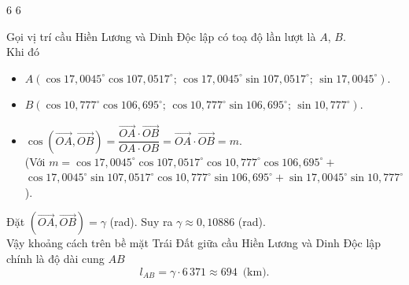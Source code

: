 \documentclass[12pt,a4paper,openany,twoside]{book}
\begin{document}
\begin{bt}
{\begin{center}
\begin{tikzpicture}[line join=round,line cap=round,font=\footnotesize,scale=1,>=stealth]
				\end{tikzpicture}6
			 6
		\end{center}
		Gọi vị trí cầu Hiền Lương và Dinh Độc lập có toạ độ lần lượt là $A$, $B$.\\ 
		Khi đó 
		\begin{itemize}
			\item  $A\left(\cos 17{,}0045^\circ \cos 107{,}0517^\circ;\, \cos 17{,}0045^\circ \sin 107{,}0517^\circ;\, \sin 17{,}0045^\circ\right)$.
			\item  $B\left(\cos 10{,}777^\circ \cos 106{,}695^\circ;\, \cos 10{,}777^\circ \sin 106{,}695^\circ;\, \sin 10{,}777^\circ\right)$.
			 \item $\cos \left(\overrightarrow{OA}, \overrightarrow{OB}\right) =\dfrac{\overrightarrow{OA}\cdot \overrightarrow{OB}}{OA\cdot OB}=\overrightarrow{OA}\cdot \overrightarrow{OB}=m$.\\
			(Với $m=\cos 17{,}0045^\circ \cos 107{,}0517^\circ \cos 10{,}777^\circ \cos 106{,}695^\circ +$\\ $\cos 17{,}0045^\circ \sin 107{,}0517^\circ \cos 10{,}777^\circ \sin 106{,}695^\circ + \sin  17{,}0045^\circ \sin 10{,}777^\circ$).
		\end{itemize}
		Đặt $\left(\overrightarrow{OA}, \overrightarrow{OB}\right)=\gamma  $ (rad). Suy ra $\gamma \approx 0{,}10886$ (rad).\\
		Vậy  khoảng cách trên bề mặt Trái Đất giữa cầu Hiền Lương và Dinh Độc lập chính là độ dài cung $AB$
		\[l_{AB}=\gamma\cdot 6\,371\approx 694 \, \text{ (km)}.\] 
	 }
\end{bt}
\end{document}
